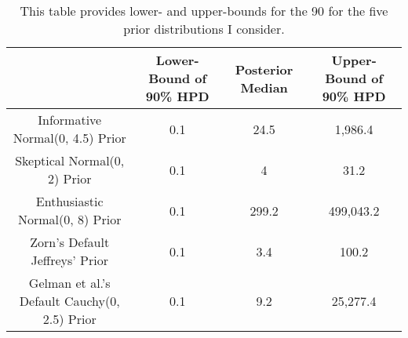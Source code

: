 \begin{table}[H]
\centering
{\scriptsize
\begin{tabular}{|cccc|}
  \hline
 & Lower-Bound of 90\% HPD & Posterior Median & Upper-Bound of 90\% HPD \\ 
  \hline
Informative Normal(0, 4.5) Prior &       0.1 &      24.5 &   1,986.4 \\ 
  Skeptical Normal(0, 2) Prior &       0.1 &         4 &      31.2 \\ 
  Enthusiastic Normal(0, 8) Prior &       0.1 &     299.2 & 499,043.2 \\ 
  Zorn's Default Jeffreys' Prior &       0.1 &       3.4 &     100.2 \\ 
  Gelman et al.'s Default Cauchy(0, 2.5) Prior &       0.1 &       9.2 &  25,277.4 \\ 
   \hline
\end{tabular}
}
\caption{This table provides lower- and upper-bounds for the 90%
              for the five prior distributions I consider.} 
\label{tab:bm-pppd-deciles}
\end{table}

